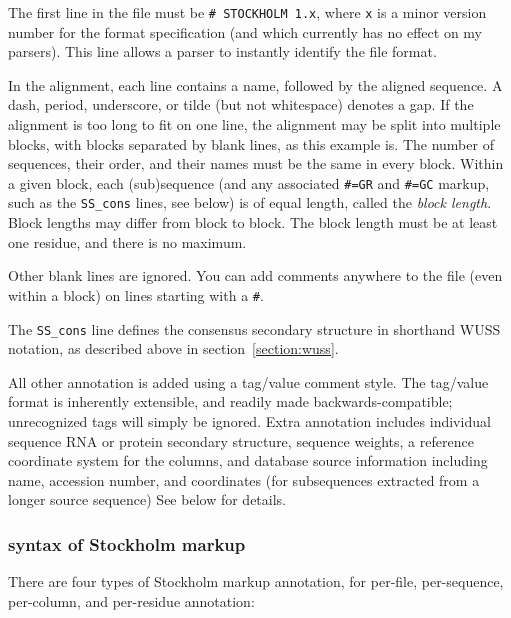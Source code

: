 The first line in the file must be \verb+# STOCKHOLM 1.x+, where
\verb+x+ is a minor version number for the format specification
(and which currently has no effect on my parsers). This line allows a
parser to instantly identify the file format.

In the alignment, each line contains a name, followed by the aligned
sequence. A dash, period, underscore, or tilde (but not whitespace)
denotes a gap. If the alignment is too long to fit on one line, the
alignment may be split into multiple blocks, with blocks separated by
blank lines, as this example is. The number of sequences, their order,
and their names must be the same in every block. Within a given block,
each (sub)sequence (and any associated \verb+#=GR+ and \verb+#=GC+
markup, such as the \verb+SS_cons+ lines, see below) is of equal
length, called the \textit{block length}. Block lengths may differ
from block to block. The block length must be at least one residue,
and there is no maximum. 

Other blank lines are ignored. You can add comments anywhere to the
file (even within a block) on lines starting with a \verb+#+.

The \verb+SS_cons+ line defines the consensus secondary structure in
shorthand WUSS notation, as described above in
section~\ref{section:wuss}.

All other annotation is added using a tag/value comment style. The
tag/value format is inherently extensible, and readily made
backwards-compatible; unrecognized tags will simply be ignored. Extra
annotation includes individual sequence RNA or protein secondary
structure, sequence weights, a reference coordinate system for the
columns, and database source information including name, accession
number, and coordinates (for subsequences extracted from a longer
source sequence) See below for details.

\subsubsection{syntax of Stockholm markup}

There are four types of Stockholm markup annotation, for per-file,
per-sequence, per-column, and per-residue annotation:

